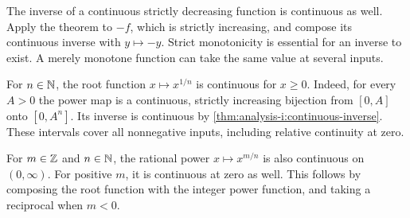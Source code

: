 The inverse of a continuous strictly decreasing function is continuous
as well. Apply the theorem to $-f$, which is strictly increasing, and
compose its continuous inverse with $y\mapsto-y$. Strict monotonicity
is essential for an inverse to exist. A merely monotone function can
take the same value at several inputs.


\begin{example}
  \label{ex:continuity:rational-powers}
  For $n\in\mathbb{N}$, the root function $x\mapsto x^{1/n}$ is continuous
  for $x\ge0$.
  Indeed, for every $A>0$ the power map is a continuous,
    strictly increasing bijection from $[0,A]$ onto $[0,A^n]$. Its inverse
    is continuous by \autoref{thm:analysis-i:continuous-inverse}. These
    intervals cover all nonnegative inputs, including relative
    continuity at zero.

  For $m\in\mathbb{Z}$ and $n\in\mathbb{N}$, the rational power
  $x\mapsto x^{m/n}$ is also continuous
  on $(0,\infty)$. For positive $m$, it is continuous
    at zero as well. This follows by composing the root function with
    the integer power function, and taking a reciprocal when $m<0$.
\end{example}
